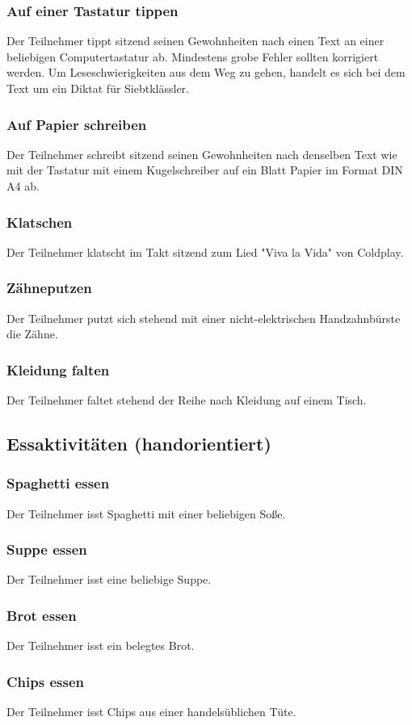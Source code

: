 \subsubsection{Auf einer Tastatur tippen}
Der Teilnehmer tippt sitzend seinen Gewohnheiten nach einen Text an einer beliebigen Computertastatur ab. Mindestens grobe Fehler sollten korrigiert werden. Um Leseschwierigkeiten aus dem Weg zu gehen, handelt es sich bei dem Text um ein Diktat für Siebtklässler.
\subsubsection{Auf Papier schreiben}
Der Teilnehmer schreibt sitzend seinen Gewohnheiten nach denselben Text wie mit der Tastatur mit einem Kugelschreiber auf ein Blatt Papier im Format DIN A4 ab.
\subsubsection{Klatschen}
Der Teilnehmer klatscht im Takt sitzend zum Lied "Viva la Vida" von Coldplay.
\subsubsection{Zähneputzen}
Der Teilnehmer putzt sich stehend mit einer nicht-elektrischen Handzahnbürste die Zähne.
\subsubsection{Kleidung falten}
Der Teilnehmer faltet stehend der Reihe nach Kleidung auf einem Tisch.

\subsection{Essaktivitäten (handorientiert)}
\subsubsection{Spaghetti essen}
Der Teilnehmer isst Spaghetti mit einer beliebigen Soße.
\subsubsection{Suppe essen}
Der Teilnehmer isst eine beliebige Suppe.
\subsubsection{Brot essen}
Der Teilnehmer isst ein belegtes Brot.
\subsubsection{Chips essen}
Der Teilnehmer isst Chips aus einer handelsüblichen Tüte.
